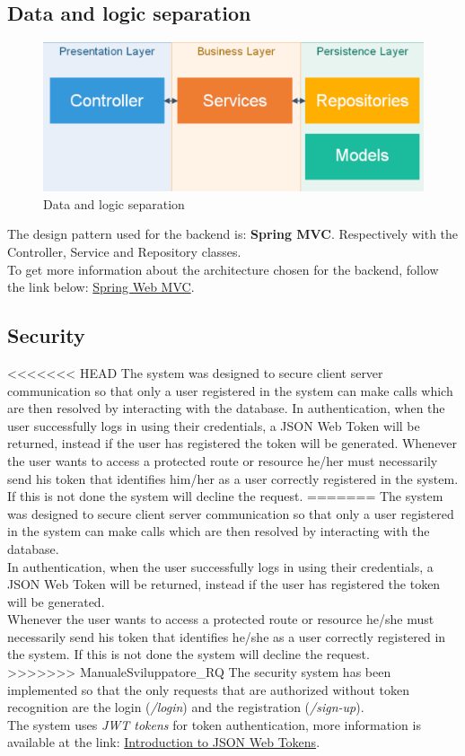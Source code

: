 \subsection{Data and logic separation}
\begin{figure}[H]
\centering 
\includegraphics[scale=0.3]{uml/backendArchitecture.png} 
\caption{Data and logic separation}
\end{figure}

The design pattern used for the backend is: \textbf{Spring MVC}.
Respectively with the Controller, Service and Repository classes.
\\ 
To get more information about the architecture chosen for the backend, follow the link below: \href{https://docs.spring.io/spring/docs/current/spring-framework-reference/web.html}{Spring Web MVC}.


\subsection{Security}
<<<<<<< HEAD
The system was designed to secure client server communication so that only a user registered in the system can make calls which are then resolved by interacting with the database. 
In authentication, when the user successfully logs in using their credentials, a JSON Web Token will be returned, instead if the user has registered the token will be generated. Whenever the user wants to access a protected route or resource he/her must necessarily send his token that identifies him/her as a user correctly registered in the system. If this is not done the system will decline the request. 
=======
The system was designed to secure client server communication so that only a user registered in the system can make calls which are then resolved by interacting with the database.\\
In authentication, when the user successfully logs in using their credentials, a JSON Web Token will be returned, instead if the user has registered the token will be generated.\\
Whenever the user wants to access a protected route or resource he/she must necessarily send his token that identifies he/she as a user correctly registered in the system. If this is not done the system will decline the request.\\
>>>>>>> ManualeSviluppatore_RQ
The security system has been implemented so that the only requests that are authorized without token recognition are the login (\textit{/login}) and the registration (\textit{/sign-up}).\\
The system uses \textit{JWT tokens} for token authentication, more information is available at the link: \href{https://jwt.io/introduction/}{Introduction to JSON Web Tokens}.

